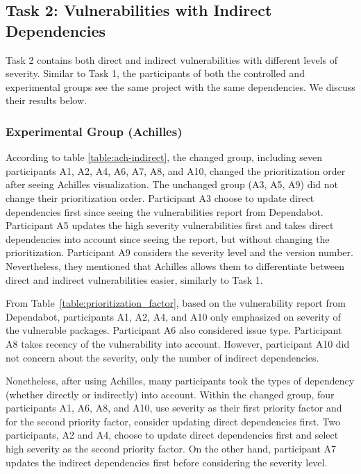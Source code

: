 \documentclass[conference]{IEEEtran}
\begin{document}
	\subsection{Task 2: Vulnerabilities with Indirect Dependencies}
	Task 2 contains both direct and indirect vulnerabilities with different levels of severity. Similar to Task 1, the participants of both the controlled and experimental groups see the same project with the same dependencies. We discuss their results below.
	
	\subsubsection{Experimental Group (Achilles)}
	According to table \ref{table:ach-indirect},
	the changed group, including seven participants A1, A2, A4, A6, A7, A8, and A10, changed the prioritization order after seeing Achilles visualization.  	
	The unchanged group (A3, A5, A9) did not change their prioritization order. Participant A3 choose to update direct dependencies first since seeing the vulnerabilities report from Dependabot. Participant A5 updates the high severity vulnerabilities first and takes direct dependencies into account since seeing the report, but without changing the prioritization. Participant A9 considers the severity level and the version number. Nevertheless, they mentioned that Achilles allows them to differentiate between direct and indirect vulnerabilities easier, similarly to Task 1.
	
	From Table~\ref{table:prioritization_factor}, based on the vulnerability report from Dependabot, participants A1, A2, A4, and A10 only emphasized on severity of the vulnerable packages. Participant A6 also considered issue type. Participant A8 takes recency of the vulnerability into account. However, participant A10 did not concern about the severity, only the number of indirect dependencies.
	
	Nonetheless, after using Achilles, many participants took the types of dependency (whether directly or indirectly) into account. Within the changed group, four participants A1, A6, A8, and A10, use severity as their first priority factor and for the second priority factor, consider updating direct dependencies first. Two participants, A2 and A4, choose to update direct dependencies first and select high severity as the second priority factor. On the other hand, participant A7 updates the indirect dependencies first before considering the severity level.
	
\end{document}

